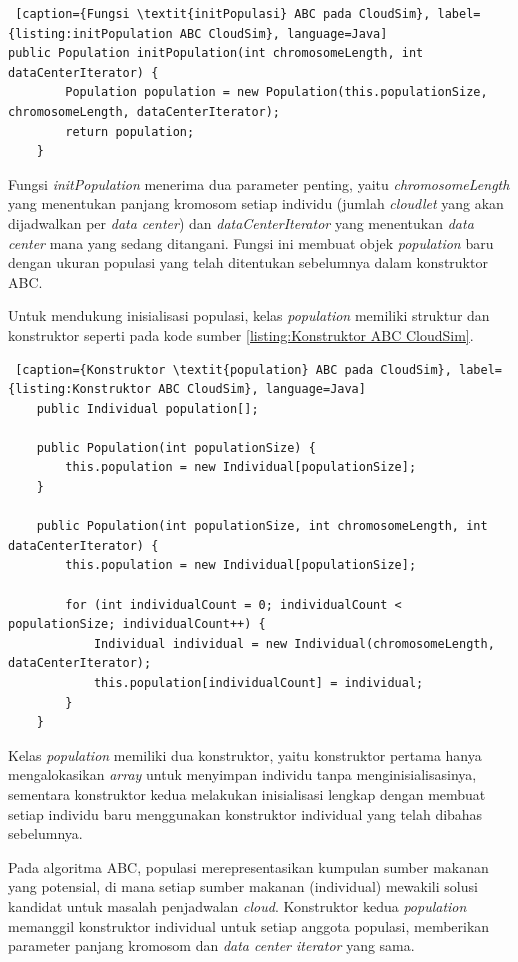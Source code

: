 \begin{lstlisting} [caption={Fungsi \textit{initPopulasi} ABC pada CloudSim}, label={listing:initPopulation ABC CloudSim}, language=Java]
public Population initPopulation(int chromosomeLength, int dataCenterIterator) {
        Population population = new Population(this.populationSize, chromosomeLength, dataCenterIterator);
        return population;
    }
\end{lstlisting}

Fungsi \textit{initPopulation} menerima dua parameter penting, yaitu \textit{chromosomeLength} yang menentukan panjang kromosom setiap individu (jumlah \textit{cloudlet} yang akan dijadwalkan per \textit{data center}) dan \textit{dataCenterIterator} yang menentukan \textit{data center} mana yang sedang ditangani. Fungsi ini membuat objek \textit{population} baru dengan ukuran populasi yang telah ditentukan sebelumnya dalam konstruktor ABC. 

Untuk mendukung inisialisasi populasi, kelas \textit{population} memiliki struktur dan konstruktor seperti pada kode sumber \ref{listing:Konstruktor ABC CloudSim}.
\begin{lstlisting} [caption={Konstruktor \textit{population} ABC pada CloudSim}, label={listing:Konstruktor ABC CloudSim}, language=Java]
    public Individual population[];

    public Population(int populationSize) {
        this.population = new Individual[populationSize];
    }

    public Population(int populationSize, int chromosomeLength, int dataCenterIterator) {
        this.population = new Individual[populationSize];

        for (int individualCount = 0; individualCount < populationSize; individualCount++) {
            Individual individual = new Individual(chromosomeLength, dataCenterIterator);
            this.population[individualCount] = individual;
        }
    }
\end{lstlisting}

Kelas \textit{population} memiliki dua konstruktor, yaitu konstruktor pertama hanya mengalokasikan \textit{array} untuk menyimpan individu tanpa menginisialisasinya, sementara konstruktor kedua melakukan inisialisasi lengkap dengan membuat setiap individu baru menggunakan konstruktor individual yang telah dibahas sebelumnya.

Pada algoritma ABC, populasi merepresentasikan kumpulan sumber makanan yang potensial, di mana setiap sumber makanan (individual) mewakili solusi kandidat untuk masalah penjadwalan \textit{cloud}. Konstruktor kedua \textit{population} memanggil konstruktor individual untuk setiap anggota populasi, memberikan parameter panjang kromosom dan \textit{data center iterator} yang sama.

